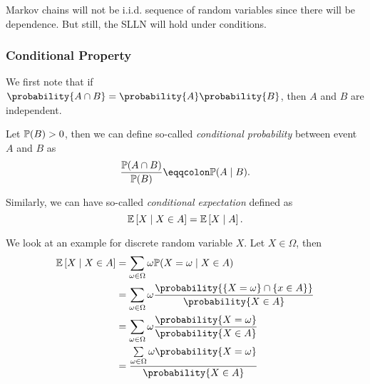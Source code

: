 \begin{note}
	Markov chains will not be i.i.d. sequence of random variables since there will be dependence. But still, the SLLN will hold under conditions.
\end{note}

\subsubsection{Conditional Property}
\begin{prev}
	We first note that if \(\probability{A\cap B} = \probability{A} \probability{B} \), then \(A\) and \(B\) are independent.
\end{prev}

\begin{definition}
	Let \(\mathbb{\MakeUppercase{P}}(B)>0\), then we can define so-called \emph{conditional probability} between event \(A\) and \(B\) as
	\[
		\frac{\mathbb{\MakeUppercase{P}}(A\cap B)}{\mathbb{\MakeUppercase{P}}(B)} \eqqcolon \mathbb{\MakeUppercase{P}}(A \mid B).
	\]
\end{definition}

\begin{definition}
	Similarly, we can have so-called \emph{conditional expectation} defined as
	\[
		\mathbb{\MakeUppercase{E}}\left[ X \mid X\in A \right] = \mathbb{\MakeUppercase{E}}\left[ X \mid A \right] .
	\]
\end{definition}

\begin{eg}
	We look at an example for discrete random variable \(X\). Let \(X\in \Omega\), then
	\[
		\begin{split}
			\mathbb{\MakeUppercase{E}}\left[ X \mid X\in A \right] &= \sum\limits_{\omega\in \Omega} \omega\mathbb{\MakeUppercase{P}}(X = \omega \mid X\in A)\\
			&=\sum\limits_{\omega\in \Omega} \omega \frac{\probability{\left\{X = \omega\right\}\cap \left\{x\in A\right\}} }{\probability{X\in A} }\\
			&=\sum\limits_{\omega\in \Omega} \omega \frac{\probability{X = \omega}}{\probability{X\in A} }\\
			&=\frac{\sum\limits_{\omega\in \Omega} \omega \probability{X = \omega}}{\probability{X\in A}}
		\end{split}
	\]
\end{eg}

